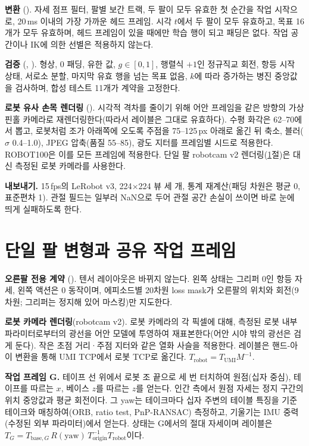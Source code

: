 \documentclass[conference,10pt]{IEEEtran}
\begin{document}
\textbf{변환} (). 자세 점프 필터, 팔별 보간 트랙, 두 팔이 모두 유효한 첫 순간을 작업 시작으로, 20\,ms 이내의 가장
가까운 헤드 프레임. 시각 $t$에서 두 팔이 모두 유효하고, 목표 16개가 모두 유효하며, 헤드 프레임이 있을 때에만 학습 행이 되고 패딩은
없다. 작업 공간이나 IK에 의한 선별은 적용하지 않는다.

\textbf{검증} (, ). 형상, 0 패딩, 유한 값, $g\in[0,1]$, 행렬식 $+1$인 정규직교 회전, 항등 시작 상태,
서로소 분할, 마지막 유효 행을 넘는 목표 없음, $k$에 따라 증가하는 병진 중앙값을 검사하며, 합성 테스트 11개가 계약을 고정한다.

\textbf{로봇 유사 손목 렌더링} (). 시각적 격차를 줄이기 위해 어안 프레임을 같은 방향의
가상 핀홀 카메라로 재렌더링한다(따라서 레이블은 그대로 유효하다). 수평 화각은 62--70\textdegree{}에서 뽑고, 로봇처럼 조가 아래쪽에
오도록 주점을 75--125\,px 아래로 옮긴 뒤 축소, 블러($\sigma$ 0.4--1.0), JPEG 압축(품질 55--85), 광도 지터를 프레임별 시드로
적용한다. ROBOT100은 이를 모든 프레임에 적용한다. 단일 팔 robotcam v2 렌더링(\ref{m:sec:hra}절)은 대신 측정된 로봇 카메라를 사용한다.

\textbf{내보내기.} 15\,fps의 LeRobot v3, 224$\times$224 뷰 세 개, 통계 재계산(패딩 차원은 평균 0, 표준편차 1). 관절 필드는 일부러
NaN으로 두어 관절 공간 손실이 쓰이면 바로 눈에 띄게 실패하도록 한다.

\section{단일 팔 변형과 공유 작업 프레임}\label{m:sec:hra}
\textbf{오른팔 전용 계약} (). 텐서 레이아웃은 바뀌지 않는다. 왼쪽 상태는 그리퍼 0인 항등 자세, 왼쪽 액션은 0
동작이며, 에피소드별 20차원 loss mask가 오른팔의 위치와 회전(9차원; 그리퍼는 정지해 있어 마스킹)만 지도한다.

\textbf{로봇 카메라 렌더링}(robotcam v2). 로봇 카메라의 각 픽셀에 대해, 측정된 로봇 내부 파라미터로부터의 광선을 어안 모델에
투영하여 재표본한다(어안 시야 밖의 광선은 검게 둔다). 작은 초점 거리·주점 지터와 같은 열화 사슬을 적용한다. 레이블은 핸드-아이
변환을 통해 UMI TCP에서 로봇 TCP로 옮긴다. $T_\text{robot}=T_\text{UMI}M^{-1}$.

\textbf{작업 프레임 G.} 테이프 선 위에서 로봇 조 끝으로 세 번 터치하여 원점(십자 중심), 테이프를 따르는 $x$, 베이스 $z$를 따르는
$z$를 얻는다. 인간 측에서 원점 자세는 정지 구간의 위치 중앙값과 평균 회전이다. 그 yaw는 테이크마다 십자 주변의 테이블 특징을 기준
테이크와 매칭하여(ORB, ratio test, PnP-RANSAC) 측정하고, 기울기는 IMU 중력(수정된 외부 파라미터)에서 얻는다. 상태는 G에서의 절대
자세이며 레이블은 $T_G = T_{\text{base},G}\,R(\text{yaw})\,T_\text{origin}^{-1}T_\text{robot}$이다.
\end{document}
